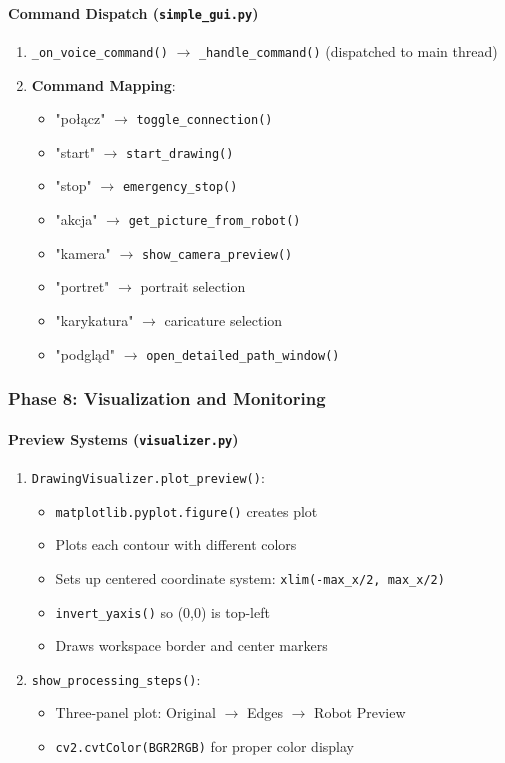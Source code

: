 \documentclass[a4paper,12pt]{article}
\begin{document}
\paragraph{Command Dispatch (\texttt{simple\_gui.py})}
\begin{enumerate}
\item \texttt{\_on\_voice\_command()} $\rightarrow$ \texttt{\_handle\_command()} (dispatched to main thread)
\item \textbf{Command Mapping}:
	\begin{itemize}
	\item "połącz" $\rightarrow$ \texttt{toggle\_connection()}
	\item "start" $\rightarrow$ \texttt{start\_drawing()}
	\item "stop" $\rightarrow$ \texttt{emergency\_stop()}
	\item "akcja" $\rightarrow$ \texttt{get\_picture\_from\_robot()}
	\item "kamera" $\rightarrow$ \texttt{show\_camera\_preview()}
	\item "portret" $\rightarrow$ portrait selection
	\item "karykatura" $\rightarrow$ caricature selection
	\item "podgląd" $\rightarrow$ \texttt{open\_detailed\_path\_window()}
	\end{itemize}
\end{enumerate}

\subsubsection{Phase 8: Visualization and Monitoring}

\paragraph{Preview Systems (\texttt{visualizer.py})}
\begin{enumerate}
\item \texttt{DrawingVisualizer.plot\_preview()}:
	\begin{itemize}
	\item \texttt{matplotlib.pyplot.figure()} creates plot
	\item Plots each contour with different colors
	\item Sets up centered coordinate system: \texttt{xlim(-max\_x/2, max\_x/2)}
	\item \texttt{invert\_yaxis()} so (0,0) is top-left
	\item Draws workspace border and center markers
	\end{itemize}

\item \texttt{show\_processing\_steps()}:
	\begin{itemize}
	\item Three-panel plot: Original $\rightarrow$ Edges $\rightarrow$ Robot Preview
	\item \texttt{cv2.cvtColor(BGR2RGB)} for proper color display
	\end{itemize}
\end{enumerate}
\end{document}
